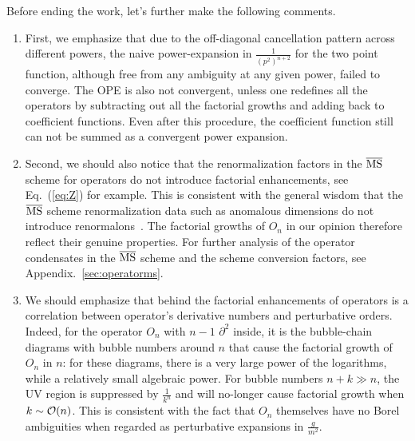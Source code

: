 \documentclass[a4paper,11pt]{article}
\begin{document}
Before ending the work, let's further make the following comments.
\begin{enumerate}
    \item First, we emphasize that due to the off-diagonal cancellation pattern across different powers, the naive power-expansion in $\frac{1}{(p^2)^{n+2}}$ for the two point function, although free from any ambiguity at any given power, failed to converge. The OPE is also not convergent, unless one redefines all the operators by subtracting out all the factorial growths and adding back to coefficient functions. Even after this procedure, the coefficient function still can not be summed as a convergent power expansion. 
    \item Second, we should also notice that the renormalization factors in the $\overline{\rm MS}$ scheme for operators do not introduce factorial enhancements,  see Eq.~(\ref{eq:Z}) for example. This is consistent with the general wisdom that the $\overline{\rm MS}$ scheme renormalization data such as anomalous dimensions do not introduce renormalons~\cite{Palanques-Mestre:1983ogz}. The factorial growths of $O_n$ in our opinion therefore reflect their genuine properties. For further analysis of the operator condensates in the $\overline{\rm MS}$ scheme and the scheme conversion factors, see Appendix.~\ref{sec:operatorms}.

    
    \item We should emphasize that behind the factorial enhancements of operators is a correlation between operator's derivative numbers and perturbative orders. Indeed, for the operator $O_n$ with $n-1$ $\partial^2$ inside, it is the bubble-chain diagrams with bubble numbers around $n$ that cause the factorial growth of $O_n$ in $n$: for these diagrams, there is a very large power of the logarithms, while a relatively small algebraic power. For bubble numbers $n+k \gg n$, the UV region is suppressed by $\frac{1}{k^n}$ and will no-longer cause factorial growth when $k\sim{\cal O}(n)$. This is consistent with the fact that $O_n$ themselves have no Borel ambiguities when regarded as perturbative expansions in $\frac{g}{m^2}$.  
    

\end{enumerate}
\end{document}
